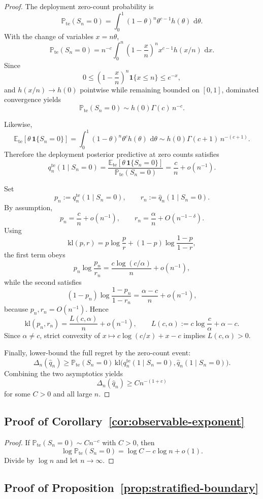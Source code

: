 \documentclass{article}
\theoremstyle{definition}
\theoremstyle{remark}
\newcommand{\E}{\mathbb{E}}
\newcommand{\Pbb}{\mathbb{P}}
\newcommand{\ind}{\mathbf{1}}
\newcommand{\te}{\mathrm{te}}
\newcommand{\klb}{\mathrm{kl}}
\newcommand{\dd}{\,\mathrm{d}}
\begin{document}
\begin{proof}
The deployment zero-count probability is
\[
\Pbb_{\te}(S_n=0)
=
\int_0^1 (1-\theta)^n \theta^{c-1}h(\theta)\,\dd\theta.
\]
With the change of variables $x=n\theta$,
\[
\Pbb_{\te}(S_n=0)
=
n^{-c}
\int_0^n
\left(1-\frac{x}{n}\right)^n
x^{c-1} h(x/n)\,\dd x.
\]
Since
\[
0\le \left(1-\frac{x}{n}\right)^n \ind\{x\le n\}\le e^{-x},
\]
and $h(x/n)\to h(0)$ pointwise while remaining bounded on $[0,1]$, dominated convergence yields
\[
\Pbb_{\te}(S_n=0)\sim h(0)\Gamma(c)\,n^{-c}.
\]

Likewise,
\[
\E_{\te}[\theta\,\ind\{S_n=0\}]
=
\int_0^1 (1-\theta)^n \theta^c h(\theta)\,\dd\theta
\sim
h(0)\Gamma(c+1)\,n^{-(c+1)}.
\]
Therefore the deployment posterior predictive at zero counts satisfies
\[
q_n^{\te}(1\mid S_n=0)
=
\frac{\E_{\te}[\theta\,\ind\{S_n=0\}]}{\Pbb_{\te}(S_n=0)}
=
\frac{c}{n}+o(n^{-1}).
\]

Set
\[
p_n:=q_n^{\te}(1\mid S_n=0),
\qquad
r_n:=\hat q_n(1\mid S_n=0).
\]
By assumption,
\[
p_n=\frac{c}{n}+o(n^{-1}),
\qquad
r_n=\frac{\alpha}{n}+O(n^{-1-\delta}).
\]
Using
\[
\klb(p,r)=p\log\frac{p}{r}+(1-p)\log\frac{1-p}{1-r},
\]
the first term obeys
\[
p_n\log\frac{p_n}{r_n}
=
\frac{c\log(c/\alpha)}{n}+o(n^{-1}),
\]
while the second satisfies
\[
(1-p_n)\log\frac{1-p_n}{1-r_n}
=
\frac{\alpha-c}{n}+o(n^{-1}),
\]
because $p_n,r_n=O(n^{-1})$. Hence
\[
\klb(p_n,r_n)
=
\frac{L(c,\alpha)}{n}+o(n^{-1}),
\qquad
L(c,\alpha):=c\log\frac{c}{\alpha}+\alpha-c.
\]
Since $\alpha\neq c$, strict convexity of $x\mapsto c\log(c/x)+x-c$ implies $L(c,\alpha)>0$.

Finally, lower-bound the full regret by the zero-count event:
\[
\Delta_n(\hat q_n)
\ge
\Pbb_{\te}(S_n=0)\,
\klb\bigl(
q_n^{\te}(1\mid S_n=0),
\hat q_n(1\mid S_n=0)
\bigr).
\]
Combining the two asymptotics yields
\[
\Delta_n(\hat q_n)\ge C n^{-(1+c)}
\]
for some $C>0$ and all large $n$.
\end{proof}

\subsection{Proof of Corollary~\ref{cor:observable-exponent}}

\begin{proof}
If $\Pbb_{\te}(S_n=0)\sim C n^{-c}$ with $C>0$, then
\[
\log \Pbb_{\te}(S_n=0)
=
\log C - c\log n + o(1).
\]
Divide by $\log n$ and let $n\to\infty$.
\end{proof}

\subsection{Proof of Proposition~\ref{prop:stratified-boundary}}
\end{document}
